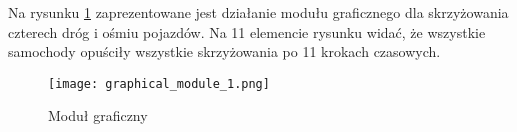 \newline
\newline
Na rysunku \ref{graphical-framework} zaprezentowane jest działanie modułu graficznego dla skrzyżowania czterech dróg i ośmiu pojazdów. Na 11 elemencie rysunku widać, że wszystkie samochody opuściły wszystkie skrzyżowania po 11 krokach czasowych.
\begin{figure}
    \texttt{[image: graphical\_module\_1.png]}
  \caption{Moduł graficzny}
  \label{graphical-framework}
\end{figure}
\newpage
